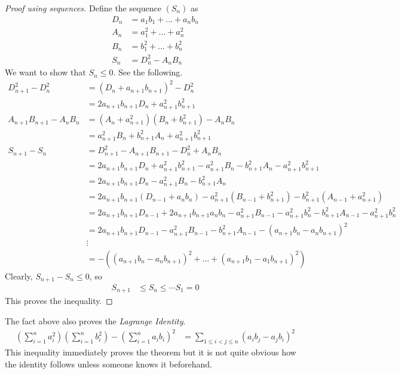 \documentclass{subfile}
\begin{document}
		\begin{proof}[Proof using sequences]
			Define the sequence $(S_n)$ as
				\begin{align*}
					D_n
						& = a_1b_1+\ldots+a_nb_n\\
					A_n
						& = a_1^2+\ldots+a_n^2\\
					B_n
						& = b_1^2+\ldots+b_n^2\\
					S_n
						& = D_n^2-A_nB_n
				\end{align*}
			We want to show that $S_n\leq0$. See the following.
				\begin{align*}
					D_{n+1}^2-D_n^2
						& = (D_n+a_{n+1}b_{n+1})^2-D_n^2\\
						& = 2a_{n+1}b_{n+1}D_n+a_{n+1}^2b_{n+1}^2\\
					A_{n+1}B_{n+1}-A_nB_n
						& = (A_n+a_{n+1}^2)(B_n+b_{n+1}^2)-A_nB_n\\
						& = a_{n+1}^2B_n+b_{n+1}^2A_n+a_{n+1}^2b_{n+1}^2\\
					S_{n+1}-S_n
						& = D_{n+1}^2-A_{n+1}B_{n+1}-D_n^2+A_nB_n\\
						& = 2a_{n+1}b_{n+1}D_n+a_{n+1}^2b_{n+1}^2-a_{n+1}^2B_n-b_{n+1}^2A_n-a_{n+1}^2b_{n+1}^2\\
						& = 2a_{n+1}b_{n+1}D_n-a_{n+1}^2B_n-b_{n+1}^2A_n\\
						& = 2a_{n+1}b_{n+1}(D_{n-1}+a_nb_n)-a_{n+1}^2(B_{n-1}+b_{n+1}^2)-b_{n+1}^2(A_{n-1}+a_{n+1}^2)\\
						& = 2a_{n+1}b_{n+1}D_{n-1}+2a_{n+1}b_{n+1}a_nb_n-a_{n+1}^2B_{n-1}-a_{n+1}^2b_{n}^2-b_{n+1}^2A_{n-1}-a_{n+1}^2b_{n}^2\\
						& = 2a_{n+1}b_{n+1}D_{n-1}-a_{n+1}^2B_{n-1}-b_{n+1}^2A_{n-1}-(a_{n+1}b_n-a_{n}b_{n+1})^2\\
						& \vdots\\
						& = -\left((a_{n+1}b_n-a_nb_{n+1})^2+\ldots+(a_{n+1}b_1-a_1b_{n+1})^2\right)
				\end{align*}
			Clearly, $S_{n+1}-S_n\leq0$, so
				\begin{align*}
					S_{n+1}
						& \leq S_n\leq\cdots S_1=0
				\end{align*}
			This proves the inequality.
		\end{proof}
	The fact above also proves the \textit{Lagrange Identity}.
		\begin{align*}
			\left(\sum_{i=1}^na_i^2\right)\left(\sum_{i=1}^nb_i^2\right)-\left(\sum_{i=1}^na_ib_i\right)^2
				& = \sum_{1\leq i< j\leq n}(a_ib_j-a_jb_i)^2
		\end{align*}
	This inequality immediately proves the theorem but it is not quite obvious how the identity follows unless someone knows it beforehand.
\end{document}
